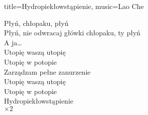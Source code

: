 \begin{song}{title={Hydropiekłowstąpienie}, music={Lao Che}}
\begin{multicols}{2}
\begin{chorus}
        Płyń, chłopaku, płyń \\
        Płyń, nie odwracaj główki chłopaku, ty płyń \\
        A ja\ldots \smallskip \\
        Utopię waszą utopię \\
        Utopię w potopie \\
        Zarządzam pełne zanurzenie \smallskip \\
        Utopię waszą utopię \\
        Utopię w potopie \\
        Hydropiekłowstąpienie \medskip \\
            $\times 2$
    \end{chorus}
\end{multicols}
\end{song}

